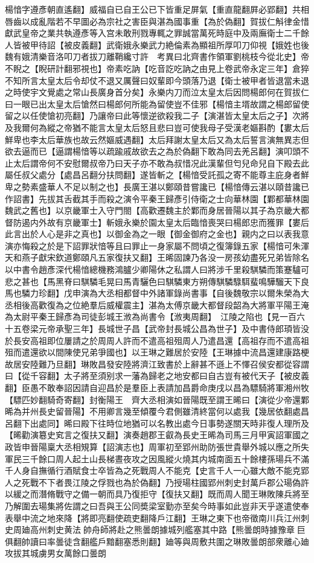 楊愔字遵彥朝直遙翻】威福自已自王公已下皆重足屏氣【重直龍翻屛必郢翻】共相唇齒以成亂階若不早圖必為宗社之害臣與湛為國事重【為於偽翻】賀拔仁斛律金惜獻武皇帝之業共執遵彥等入宫未敢刑戮專輒之罪誠當萬死時庭中及兩廡衛士二千餘人皆被甲待詔【被皮義翻】武衛娥永樂武力絶倫素為顯祖所厚叩刀仰視【娥姓也後魏有娥清樂音洛叩刀者拔刀離鞘纔寸許　考異曰北齊書作領軍劉桃枝今從北史】帝不睨之【睨研計翻邪視也】帝素吃訥【吃音訖吃訥之由見上卷武帝永定三年】倉猝不知所言太皇太后令却仗不退又厲聲曰奴輩即今頭落乃退【衛士被甲者皆退當未退之時使宇文覺處之常山長廣身首分矣】永樂内刀而泣太皇太后因問楊郎何在賀拔仁曰一眼已出太皇太后愴然曰楊郎何所能為留使豈不佳邪【楊愔主壻故謂之楊郎留使留之以任使愴初亮翻】乃讓帝曰此等懷逆欲殺我二子【演湛皆太皇太后之子】次將及我爾何為縱之帝猶不能言太皇太后怒且悲曰豈可使我母子受漢老嫗斟酌【婁太后鮮卑也李太后華族也故云然嫗威遇翻】太后拜謝太皇太后又為太后誓言演無異志但欲去逼而已【逼謂楊愔等以疏踰戚故欲去之為於偽翻下敢為同去羌呂翻】演叩頭不止太后謂帝何不安慰爾叔帝乃曰天子亦不敢為叔惜况此漢輩但匄兒命兒自下殿去此屬任叔父處分【處昌呂翻分扶問翻】遂皆斬之【楊愔受託孤之寄不能尊主庇身者鮮卑之勢素盛華人不足以制之也】長廣王湛以鄭頤昔嘗讒已【楊愔傳云湛以頤昔讒已作詔書】先拔其舌截其手而殺之演令平秦王歸彥引侍衛之士向華林園【鄴都華林園魏武之舊也】以京畿軍士入守門閤【高歡遷魏主於鄴而身居晉陽以其子為京畿大都督防遏内外故有京畿軍士】斬娥永樂於園太皇太后臨愔喪哭曰楊郎忠而獲罪【婁后此言出於人心是非之真也】以御金為之一眼【御金御府之金也】親内之曰以表我意演亦悔殺之於是下詔罪狀愔等且曰罪止一身家屬不問頃之復簿錄五家【楊愔可朱渾天和燕子獻宋欽道鄭頤凡五家復扶又翻】王晞固諫乃各没一房孩幼盡死兄弟皆除名以中書令趙彥深代楊愔總機務鴻臚少卿陽休之私謂人曰將涉千里殺騏驎而策蹇驢可悲之甚也【馬黑脊曰騏驎毛晃曰馬青驪色曰騏驎東方朔傳騏驎騄駬蜚鳴驊騮天下良馬也驎力珍翻】戊申演為大丞相都督中外諸軍錄尚書事【自後魏敬宗以爾朱榮為大丞相後高歡復為之位絶羣后威權震主】湛為太傅京畿大都督段韶為大將軍平陽王淹為太尉平秦王歸彥為司徒彭城王浟為尚書令【浟夷周翻】　江陵之陷也【見一百六十五卷梁元帝承聖三年】長城世子昌【武帝封長城公昌為世子】及中書侍郎頊皆没於長安高祖即位屢請之於周周人許而不遣高祖殂周人乃遣昌還【高祖存而不遣高祖殂而遣還欲以間陳使兄弟爭國也】以王琳之難居於安陸【王琳據中流昌還建康路梗故居安陸難乃旦翻】琳敗昌發安陸將濟江致書於上辭甚不遜上不懌召侯安都從容謂曰【從千容翻】太子將至須别求一藩為歸老之地安都曰自古豈有被代天子【被皮義翻】臣愚不敢奉詔因請自迎昌於是羣臣上表請加昌爵命庚戌以昌為驃騎將軍湘州牧【驃匹妙翻騎奇寄翻】封衡陽王　齊大丞相演如晉陽既至謂王晞曰【演從少帝還鄴晞為并州長史留晉陽】不用卿言幾至傾覆今君側雖清終當何以處我【幾居依翻處昌呂翻下出處同】晞曰殿下往時位地猶可以名教出處今日事勢遂關天時非復人理所及【晞勸演簒史䆒言之復扶又翻】演奏趙郡王叡為長史王晞為司馬三月甲寅詔軍國之政皆申晉陽稟大丞相䂓算【詔演志也】周軍初至郢州助防張世貴舉外城以應之所失軍民三千餘口周人起土山長梯晝夜攻之因風縱火燒其内城南面五十餘樓孫瑒兵不滿千人身自撫循行酒賦食士卒皆為之死戰周人不能克【史言千人一心雖大敵不能克郢人之死戰不下者畏江陵之俘戮也為於偽翻】乃授瑒柱國郢州刺史封萬戶郡公瑒偽許以緩之而潛脩戰守之備一朝而具乃復拒守【復扶又翻】既而周人聞王琳敗陳兵將至乃解圍去瑒集將佐謂之曰吾與王公同奬梁室勤亦至矣今時事如此豈非天乎遂遣使奉表舉中流之地來降【將即亮翻使疏吏翻降戶江翻】王琳之東下也帝徵南川兵江州刺史周廸高州刺史黄法帥舟師將赴之熊曇朗據城列艦塞其中路【熊曇朗時據豫章巨俱翻帥讀曰率曇徒含翻艦戶黯翻塞悉則翻】廸等與周敷共圍之琳敗曇朗部衆離心廸攻拔其城虜男女萬餘口曇朗